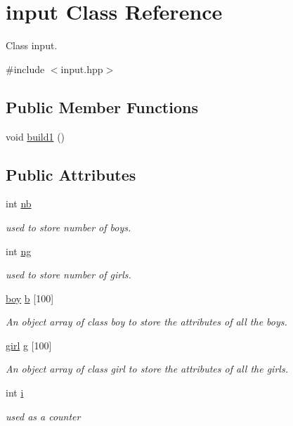 \hypertarget{classinput}{\section{input Class Reference}
\label{classinput}
}


Class input.  




{\ttfamily \#include $<$input.\-hpp$>$}

\subsection*{Public Member Functions}
\begin{DoxyCompactItemize}
\item 
void \hyperlink{classinput_a0719273a78c2af8dbc3a90562c95a898}{build1} ()
\end{DoxyCompactItemize}
\subsection*{Public Attributes}
\begin{DoxyCompactItemize}
\item 
int \hyperlink{classinput_af078aeb4578ebe86a35f302e99119ac9}{nb}
\begin{DoxyCompactList}\small\item\em used to store number of boys. \end{DoxyCompactList}\item 
int \hyperlink{classinput_ac3566988d536a8b7443230e3b7a9337e}{ng}
\begin{DoxyCompactList}\small\item\em used to store number of girls. \end{DoxyCompactList}\item 
\hyperlink{classboy}{boy} \hyperlink{classinput_a6fca7a23691eb7cbf746c09b07b90686}{b} \mbox{[}100\mbox{]}
\begin{DoxyCompactList}\small\item\em An object array of class boy to store the attributes of all the boys. \end{DoxyCompactList}\item 
\hyperlink{classgirl}{girl} \hyperlink{classinput_a8e17a0653c08e21af26f4f62c0f5069f}{g} \mbox{[}100\mbox{]}
\begin{DoxyCompactList}\small\item\em An object array of class girl to store the attributes of all the girls. \end{DoxyCompactList}\item 
int \hyperlink{classinput_a79e666b856965a7115fe0136b6ddc384}{i}
\begin{DoxyCompactList}\small\item\em used as a counter \end{DoxyCompactList}\end{DoxyCompactItemize}



